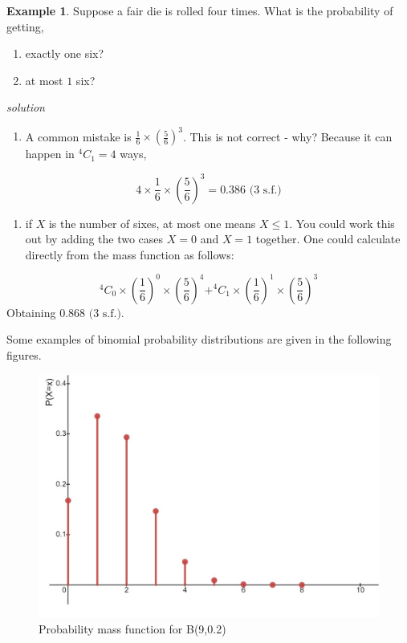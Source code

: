 \documentclass[
]{book}
\providecommand{\tightlist}{%
  \setlength{\itemsep}{0pt}\setlength{\parskip}{0pt}}
\theoremstyle{definition}
\theoremstyle{definition}
\newtheorem{example}{Example}[chapter]
\theoremstyle{definition}
\theoremstyle{definition}
\theoremstyle{remark}
\begin{document}
\begin{example}
\protect\hypertarget{exm:fourfairdice}{}\label{exm:fourfairdice}Suppose a fair die is rolled four times. What is the probability of getting,

\begin{enumerate}
\def\labelenumi{\alph{enumi})}
\item
  exactly one six?
\item
  at most \(1\) six?
\end{enumerate}

\emph{solution}

\begin{enumerate}
\def\labelenumi{\alph{enumi})}
\tightlist
\item
  A common mistake is \(\frac{1}{6}\times \left( \frac{5}{6} \right)^3\). This is not correct - why? Because it can happen in \(^4C_1=4\) ways,
\end{enumerate}

\[4\times \frac{1}{6}\times \left( \frac{5}{6} \right)^3 = 0.386 \text{ (3 s.f.)}\]

\begin{enumerate}
\def\labelenumi{\alph{enumi})}
\setcounter{enumi}{1}
\tightlist
\item
  if \(X\) is the number of sixes, at most one means \(X \leq 1\). You could work this out by adding the two cases \(X=0\) and \(X=1\) together. One could calculate directly from the mass function as follows:
\end{enumerate}

\[^4C_0 \times \left( \frac{1}{6} \right)^0 \times \left( \frac{5}{6} \right)^4+ ^4C_1 \times \left( \frac{1}{6} \right)^1 \times \left( \frac{5}{6} \right)^3\]
Obtaining \(0.868\text{ (3 s.f.)}\).
\end{example}

Some examples of binomial probability distributions are given in the following figures.

\begin{figure}

{\centering \includegraphics[width=0.75\linewidth]{./figures/binomial1} 

}

\caption{Probability mass function for B(9,0.2)}\label{fig:bin1}
\end{figure}
\end{document}
